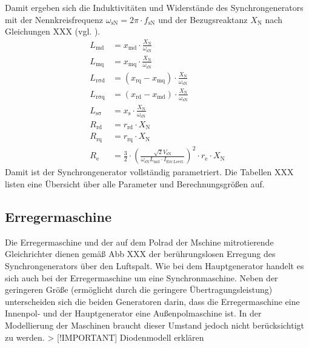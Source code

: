 Damit ergeben sich die Induktivitäten und Widerstände des
Synchrongenerators mit der Nennkreisfrequenz
\(\omega_{\mathrm{sN}}=2\pi\cdot f_{\mathrm{sN}}\) und der
Bezugsreaktanz \(X_{\mathrm{N}}\) nach Gleichungen XXX (vgl.
\cite[S.265f.]{kralModelicaObjektorientierteModellbildung2019}).
\begin{align}
L_{\mathrm{md}} &= x_{\mathrm{md}}\cdot \frac{X_{\mathrm{N}}}{\omega_{\mathrm{sN}}} \\
L_{\mathrm{mq}} &= x_{\mathrm{mq}}\cdot \frac{X_{\mathrm{N}}}{\omega_{\mathrm{sN}}} \\
L_{\mathrm{r \sigma d}} &= (x_{\mathrm{rq}}-x_{\mathrm{mq}})\cdot \frac{X_{\mathrm{N}}}{\omega_{\mathrm{sN}}} \\
L_{\mathrm{r \sigma q}} &= (x_{\mathrm{rd}}-x_{\mathrm{md}})\cdot \frac{X_{\mathrm{N}}}{\omega_{\mathrm{sN}}} \\
L_{\mathrm{s \sigma}} &= x_{\mathrm{s}}\cdot \frac{X_{\mathrm{N}}}{\omega_{\mathrm{sN}}} \\
R_{\mathrm{rd}} &= r_{\mathrm{rd}}\cdot X_{\mathrm{N}} \\
R_{\mathrm{rq}} &= r_{\mathrm{rq}}\cdot X_{\mathrm{N}} \\
R_{\mathrm{e}} &= \frac{3}{2}\cdot \left(\frac{\sqrt{2}V_{\mathrm{sN}}}{\omega_{\mathrm{sN}}L_{\mathrm{md}}\cdot I_{\mathrm{Err. Leerl.}}}\right)^2\cdot r_{\mathrm{e}}\cdot X_{\mathrm{N}}
\end{align}
Damit ist der Synchrongenerator vollständig parametriert. Die Tabellen
XXX listen eine Übersicht über alle Parameter und Berechnungsgrößen auf.

\hypertarget{erregermaschine}{%
\subsection{Erregermaschine}\label{erregermaschine}}

Die Erregermaschine und der auf dem Polrad der Mschine mitrotierende
Gleichrichter dienen gemäß Abb XXX der berührungslosen Erregung des
Synchrongenerators über den Luftspalt. Wie bei dem Hauptgenerator
handelt es sich auch bei der Erregermaschine um eine Synchronmaschine.
Neben der geringeren Größe (ermöglicht durch die geringere
Übertragungsleistung) unterscheiden sich die beiden Generatoren darin,
dass die Erregermaschine eine Innenpol- und der Hauptgenerator eine
Außenpolmaschine ist. In der Modellierung der Maschinen braucht dieser
Umstand jedoch nicht berücksichtigt zu werden. \textgreater{}
{[}!IMPORTANT{]} Diodenmodell erklären

